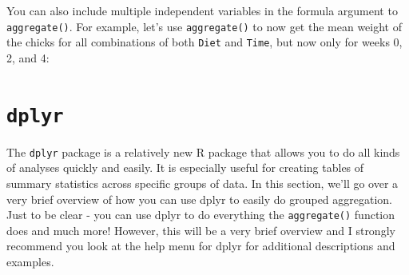 \documentclass[]{book}
\newenvironment{Shaded}{\begin{snugshade}}{\end{snugshade}}
\newcommand{\KeywordTok}[1]{\textcolor[rgb]{0.13,0.29,0.53}{\textbf{#1}}}
\newcommand{\DataTypeTok}[1]{\textcolor[rgb]{0.13,0.29,0.53}{#1}}
\newcommand{\DecValTok}[1]{\textcolor[rgb]{0.00,0.00,0.81}{#1}}
\newcommand{\StringTok}[1]{\textcolor[rgb]{0.31,0.60,0.02}{#1}}
\newcommand{\CommentTok}[1]{\textcolor[rgb]{0.56,0.35,0.01}{\textit{#1}}}
\newcommand{\OperatorTok}[1]{\textcolor[rgb]{0.81,0.36,0.00}{\textbf{#1}}}
\newcommand{\NormalTok}[1]{#1}
\theoremstyle{definition}
\theoremstyle{definition}
\theoremstyle{remark}
\begin{document}
You can also include multiple independent variables in the formula
argument to \texttt{aggregate()}. For example, let's use
\texttt{aggregate()} to now get the mean weight of the chicks for all
combinations of both \texttt{Diet} and \texttt{Time}, but now only for
weeks 0, 2, and 4:

\begin{Shaded}
\end{Shaded}

\section{\texorpdfstring{\texttt{dplyr}}{dplyr}}\label{dplyr}

The \texttt{dplyr} package is a relatively new R package that allows you
to do all kinds of analyses quickly and easily. It is especially useful
for creating tables of summary statistics across specific groups of
data. In this section, we'll go over a very brief overview of how you
can use dplyr to easily do grouped aggregation. Just to be clear - you
can use dplyr to do everything the \texttt{aggregate()} function does
and much more! However, this will be a very brief overview and I
strongly recommend you look at the help menu for dplyr for additional
descriptions and examples.
\end{document}
